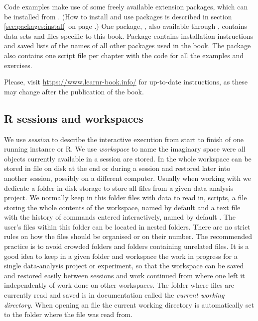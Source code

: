 \documentclass[krantz2]{krantz}\usepackage{knitr}
\begin{document}
Code examples make use of some freely available \Rlang extension packages, which can be installed from \CRAN. (How to install and use packages is described in section \ref{sec:packages:install} on page \pageref{sec:packages:install}.) One package, , also available through \CRAN, contains data sets and files specific to this book. Package  contains installation instructions and saved lists of the names of all other packages used in the book. The package also contains one script file per chapter with the \Rlang code for all the examples and exercises.

Please, visit \url{https://www.learnr-book.info/} for up-to-date instructions, as these may change after the publication of the book.

\subsection{R sessions and workspaces}\label{sec:R:workspace}

We use \emph{session} to describe the interactive execution from start to finish of one running instance or R. We use \emph{workspace} to name the imaginary space were all objects currently available in a session are stored. In \Rlang the whole workspace can be stored in file on disk at the end or during a session and restored later into another session, possibly on a different computer. Usually when working with \Rlang we dedicate a folder in disk storage to store all files from a given data analysis project. We normally keep in this folder files with data to read in, scripts, a file storing the whole contents of the workspace, named by default  and a text file with the history of commands entered interactively, named by default . The user's files within this folder can be located in nested folders. There are no strict rules on how the files should be organised or on their number. The recommended practice is to avoid crowded folders and folders containing unrelated files. It is a good idea to keep in a given folder and workspace the work in progress for a single data-analysis project or experiment, so that the workspace can be saved and restored easily between sessions and work continued from where one left it independently of work done on other workspaces. The folder where files are currently read and saved is in \Rlang documentation called the \emph{current working directory}. When opening an  file the current working directory is automatically set to the folder where the  file was read from.
\end{document}
